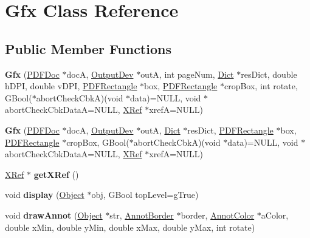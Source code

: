 \hypertarget{class_gfx}{}\section{Gfx Class Reference}
\label{class_gfx}
\subsection*{Public Member Functions}
\begin{DoxyCompactItemize}
\item 
\mbox{\label{class_gfx_a66b5747561308ee39b88a0b3f48a8629}} 
{\bfseries Gfx} (\hyperlink{class_p_d_f_doc}{P\+D\+F\+Doc} $\ast$docA, \hyperlink{class_output_dev}{Output\+Dev} $\ast$outA, int page\+Num, \hyperlink{class_dict}{Dict} $\ast$res\+Dict, double h\+D\+PI, double v\+D\+PI, \hyperlink{class_p_d_f_rectangle}{P\+D\+F\+Rectangle} $\ast$box, \hyperlink{class_p_d_f_rectangle}{P\+D\+F\+Rectangle} $\ast$crop\+Box, int rotate, G\+Bool($\ast$abort\+Check\+CbkA)(void $\ast$data)=N\+U\+LL, void $\ast$abort\+Check\+Cbk\+DataA=N\+U\+LL, \hyperlink{class_x_ref}{X\+Ref} $\ast$xrefA=N\+U\+LL)
\item 
\mbox{\label{class_gfx_aba84a2b08513aa530cd9bc1c91fcbc36}} 
{\bfseries Gfx} (\hyperlink{class_p_d_f_doc}{P\+D\+F\+Doc} $\ast$docA, \hyperlink{class_output_dev}{Output\+Dev} $\ast$outA, \hyperlink{class_dict}{Dict} $\ast$res\+Dict, \hyperlink{class_p_d_f_rectangle}{P\+D\+F\+Rectangle} $\ast$box, \hyperlink{class_p_d_f_rectangle}{P\+D\+F\+Rectangle} $\ast$crop\+Box, G\+Bool($\ast$abort\+Check\+CbkA)(void $\ast$data)=N\+U\+LL, void $\ast$abort\+Check\+Cbk\+DataA=N\+U\+LL, \hyperlink{class_x_ref}{X\+Ref} $\ast$xrefA=N\+U\+LL)
\item 
\mbox{\label{class_gfx_a371a609ae7406b33ebfac6f09e6a9b36}} 
\hyperlink{class_x_ref}{X\+Ref} $\ast$ {\bfseries get\+X\+Ref} ()
\item 
\mbox{\label{class_gfx_ae7d109265632fd67d2d9afe737e0ea2b}} 
void {\bfseries display} (\hyperlink{class_object}{Object} $\ast$obj, G\+Bool top\+Level=g\+True)
\item 
\mbox{\label{class_gfx_a204f0ffd7b63809adc761f92ad68ca42}} 
void {\bfseries draw\+Annot} (\hyperlink{class_object}{Object} $\ast$str, \hyperlink{class_annot_border}{Annot\+Border} $\ast$border, \hyperlink{class_annot_color}{Annot\+Color} $\ast$a\+Color, double x\+Min, double y\+Min, double x\+Max, double y\+Max, int rotate)

\end{DoxyCompactItemize}

